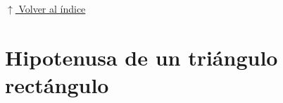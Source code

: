 \documentclass[12pt]{article}
\newcommand{\pseudocodigo}[2]{%
}
\newcommand{\volverindice}{%
    \vspace{1em}%
    \begin{flushright}%
        \hyperlink{indice}{\small $\uparrow$ Volver al índice}%
    \end{flushright}%
}
\newcommand{\enunciado}[1]{%
    \begin{quote}
        \itshape #1
    \end{quote}
}
\begin{document}
\pseudocodigo{ej03_sumatoria_1_10}{Sumatoria del 1 al 10}











\volverindice
\newpage


\section{Hipotenusa de un triángulo rectángulo}
\end{document}
